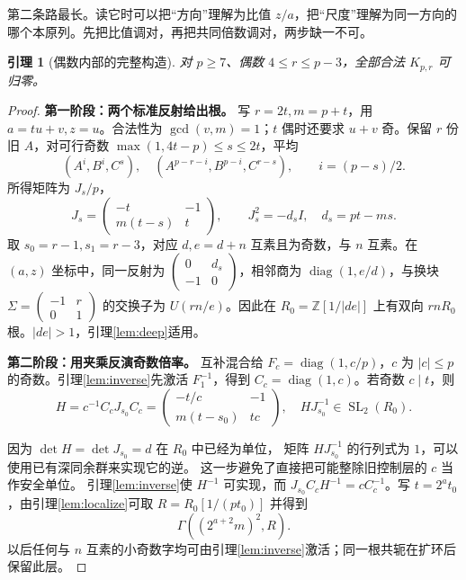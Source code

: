 \documentclass[11pt,a4paper,oneside,openany]{book}
\newcommand{\Z}{\mathbb Z}
\newcommand{\SL}{\operatorname{SL}}
\newcommand{\diag}{\operatorname{diag}}
\newtheorem{lemma}[theorem]{引理}
\theoremstyle{definition}
\numberwithin{equation}{chapter}
\begin{document}
第二条路最长。读它时可以把“方向”理解为比值 $z/a$，把“尺度”理解为同一方向的哪个本原列。先把比值调对，再把共同倍数调对，两步缺一不可。
\begin{lemma}[偶数内部的完整构造]\label{lem:even-core}
对 $p\ge7$、偶数 $4\le r\le p-3$，全部合法 $K_{p,r}$ 可归零。
\end{lemma}
\begin{proof}

\par\noindent\textbf{第一阶段：两个标准反射给出根。}
写 $r=2t,m=p+t$，用 $a=tu+v,z=u$。合法性为 $\gcd(v,m)=1$；$t$ 偶时还要求 $u+v$ 奇。保留 $r$ 份旧 $A$，对可行奇数 $\max(1,4t-p)\le s\le2t$，平均
\begin{equation}\label{eq:even-reflection}
(A^i,B^i,C^s),\quad(A^{p-r-i},B^{p-i},C^{r-s}),\qquad i=(p-s)/2.
\end{equation}
所得矩阵为 $J_s/p$，
\[
J_s=\begin{pmatrix}-t&-1\\m(t-s)&t\end{pmatrix},\qquad
J_s^2=-d_sI,\quad d_s=pt-ms.
\]
取 $s_0=r-1,s_1=r-3$，对应 $d,e=d+n$ 互素且为奇数，与 $n$ 互素。在 $(a,z)$ 坐标中，同一反射为 $\left(\begin{smallmatrix}0&d_s\\-1&0\end{smallmatrix}\right)$，相邻商为 $\diag(1,e/d)$，与换块 $\Sigma=\left(\begin{smallmatrix}-1&r\\0&1\end{smallmatrix}\right)$ 的交换子为 $U(rn/e)$。因此在 $R_0=\Z[1/|de|]$ 上有双向 $rnR_0$ 根。$|de|>1$，引理\ref{lem:deep}适用。


\par\noindent\textbf{第二阶段：用夹乘反演奇数倍率。}
互补混合给 $F_c=\diag(1,c/p)$，$c$ 为 $|c|\le p$ 的奇数。引理\ref{lem:inverse}先激活 $F_1^{-1}$，得到 $C_c=\diag(1,c)$。若奇数 $c\mid t$，则
\[
H=c^{-1}C_cJ_{s_0}C_c
=\begin{pmatrix}-t/c&-1\\m(t-s_0)&tc\end{pmatrix},\quad
HJ_{s_0}^{-1}\in\SL_2(R_0).
\]

因为 $\det H=\det J_{s_0}=d$ 在 $R_0$ 中已经为单位，
矩阵 $HJ_{s_0}^{-1}$ 的行列式为 $1$，可以使用已有深同余群来实现它的逆。
这一步避免了直接把可能整除旧控制层的 $c$ 当作安全单位。
引理\ref{lem:inverse}使 $H^{-1}$ 可实现，而 $J_{s_0}C_cH^{-1}=cC_c^{-1}$。写 $t=2^a t_0$，由引理\ref{lem:localize}可取 $R=R_0[1/(pt_0)]$ 并得到
\begin{equation}\label{eq:even-deep}
\Gamma((2^{a+2}m)^2,R).
\end{equation}
以后任何与 $n$ 互素的小奇数字均可由引理\ref{lem:inverse}激活；同一根共轭在扩环后保留此层。



\end{proof}
\end{document}
